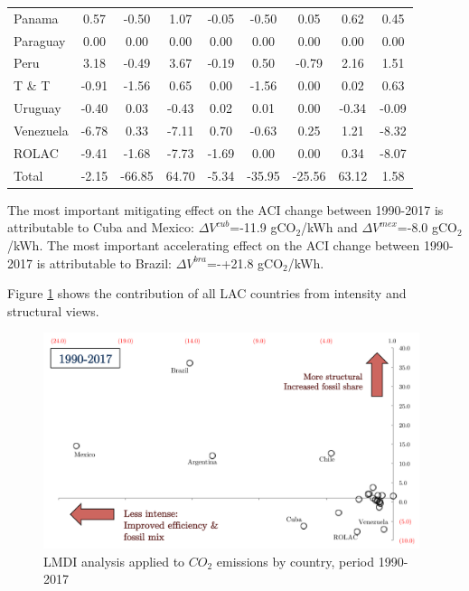 \documentclass[energies,article,accept,moreauthors,12pt,a4paper]{mdpi} %
\begin{document}
\begin{table}[!h]
\begin{center}
\begin{tabular}{l|c|c:c|ccc:cc}
Panama	&	0.57	&	-0.50	&	1.07	&	-0.05	&	-0.50	&	0.05	&	0.62	&	0.45	\\																					
Paraguay	&	0.00	&	0.00	&	0.00	&	0.00	&	0.00	&	0.00	&	0.00	&	0.00	\\																					
Peru	&	3.18	&	-0.49	&	3.67	&	-0.19	&	0.50	&	-0.79	&	2.16	&	1.51	\\																					
T \& T	&	-0.91	&	-1.56	&	0.65	&	0.00	&	-1.56	&	0.00	&	0.02	&	0.63	\\																					
Uruguay	&	-0.40	&	0.03	&	-0.43	&	0.02	&	0.01	&	0.00	&	-0.34	&	-0.09	\\																					
Venezuela	&	-6.78	&	0.33	&	-7.11	&	0.70	&	-0.63	&	0.25	&	1.21	&	-8.32	\\																					
ROLAC	&	-9.41	&	-1.68	&	-7.73	&	-1.69	&	0.00	&	0.00	&	0.34	&	-8.07	\\\hline																					
Total	&	-2.15	&	-66.85	&	64.70	&	-5.34	&	-35.95	&	-25.56	&	63.12	&	1.58																															
\end{tabular}	\label{table3}									
\end{center}										
\end{table}	

The most important mitigating effect on the ACI change between 1990-2017 is attributable to Cuba and Mexico: $\Delta V^{cub}$=-11.9 gCO$_2$/kWh and   $\Delta V^{mex}$=-8.0 gCO$_2$/kWh. The most important accelerating effect on the ACI change between 1990-2017 is attributable to Brazil: $\Delta V^{bra}$=-+21.8 gCO$_2$/kWh. 

Figure \ref{countriesPlot} shows the contribution of all LAC countries from intensity and structural views.  

        \begin{figure}[H]
	\begin{center} 
		\includegraphics[width=11cm]{images/scatter1.pdf}
		\caption{LMDI analysis applied to  $CO_2$ emissions by country, period 1990-2017} 
		\label{countriesPlot}
	\end{center} 
\end{figure}
\end{document}
